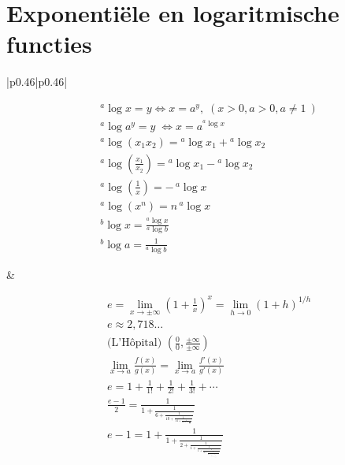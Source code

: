 \documentclass[a5paper]{article}
\begin{document}
\newpage

\section{Exponentiële en logaritmische functies}
\begin{tabular}{|p{0.46\linewidth}|p{0.46\linewidth}|}
\hline
\begin{minipage}[t]{\linewidth}\raggedright
\[
\begin{aligned}
&{}^a\!\log x = y \Leftrightarrow x=a^y,\; (x>0,a>0,a\neq 1\ )\\
&{}^a\log {a^y} = y\; \Leftrightarrow x = {a^{{}^a\log x}}\\
&{}^a\!\log(x_1x_2)={}^a\!\log x_1+{}^a\!\log x_2\\
&{}^a\!\log\!\left(\frac{x_1}{x_2}\right)={}^a\!\log x_1-{}^a\!\log x_2\\
&{}^a\!\log\!\left(\frac1x\right)=-\,{}^a\!\log x\\
&{}^a\!\log(x^n)=n\,{}^a\!\log x\\
&{}^b\!\log x=\frac{{}^a\!\log x}{{}^a\!\log b}\\
&{}^b\!\log a=\frac1{{}^a\!\log b}
\end{aligned}
\]
\end{minipage}
&
\begin{minipage}[t]{\linewidth}\raggedright
\[
\begin{aligned}
&e=\lim_{x\to\pm\infty}\left(1+\frac{1}{x}\right)^{x}=\lim_{h\to0}(1+h)^{1/h}\\
&e\approx 2{,}718\dots\\
&\text{(L'H\^opital) }\left(\frac{0}{0},\frac{\pm\infty}{\pm\infty}\right) \\
&\displaystyle \lim_{x\to a}\frac{f(x)}{g(x)}=\lim_{x\to a}\frac{f'(x)}{g'(x)}\\
&e=1+\frac{1}{1!}+\frac{1}{2!}+\frac{1}{3!}+\cdots \\
&\frac{{e - 1}}{2} = \frac{1}{{1 + \frac{1}{{6 + \frac{1}{{10 + \frac{1}{{14 + \frac{1}{{18 +  + \frac{{...}}{{...}}}}}}}}}}}} \\
&e - 1 = 1 + \frac{1}{{1 + \frac{1}{{2 + \frac{1}{{1 + \frac{1}{{1 + \frac{1}{{4 + \frac{1}{{1 + \frac{1}{{1 + \frac{1}{{6 + \frac{1}{{1 + }}}}}}}}}}}}}}}}}}
\end{aligned}
\]
\end{minipage}
\\ \hline

\end{tabular}
\end{document}

